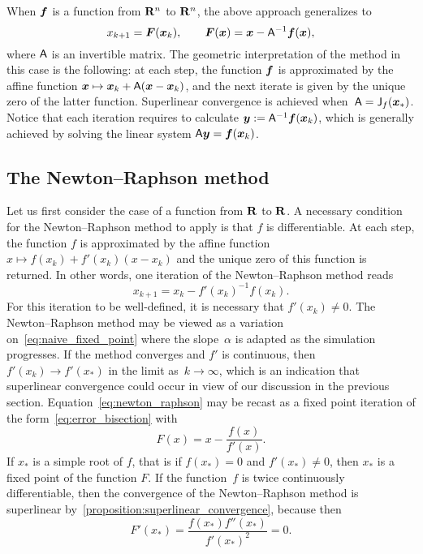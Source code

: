 When $\mathbf{\boldsymbol{f}}$ is a function from $\mathbf R^n$ to $\mathbf R^n$,
the above approach generalizes to
\[
    x_{k+1} = \mathbf{\boldsymbol{F}}(\mathbf{\boldsymbol{x}}_k), \qquad
    \mathbf{\boldsymbol{F}}(\mathbf{\boldsymbol{x}}) = \mathbf{\boldsymbol{x}} - \mathsf A^{-1} \mathbf{\boldsymbol{f}}(\mathbf{\boldsymbol{x}}),
\]
where $\mathsf A$ is an invertible matrix.
The geometric interpretation of the method in this case is the following:
at each step, the function $\mathbf{\boldsymbol{f}}$ is approximated by the affine function
$\mathbf{\boldsymbol{x}} \mapsto \mathbf{\boldsymbol{x}}_k + \mathsf A(\mathbf{\boldsymbol{x}} - \mathbf{\boldsymbol{x}}_k)$,
and the next iterate is given by the unique zero of the latter function.
Superlinear convergence is achieved when~$\mathsf A = \mathsf J_f(\mathbf{\boldsymbol{x}}_*)$.
Notice that each iteration requires to calculate $\mathbf{\boldsymbol{y}} := \mathsf A^{-1} \mathbf{\boldsymbol{f}}(\mathbf{\boldsymbol{x}}_k)$,
which is generally achieved by solving the linear system $\mathsf A \mathbf{\boldsymbol{y}} = \mathbf{\boldsymbol{f}}(\mathbf{\boldsymbol{x}}_k)$.

\subsection{The Newton--Raphson method}
\label{sub:newton_raphson}
Let us first consider the case of a function from $\mathbf R$ to $\mathbf R$.
A necessary condition for the Newton--Raphson method to apply is that $f$ is differentiable.
At each step, the function $f$ is approximated by the affine function
$x \mapsto f(x_k) + f'(x_k) (x - x_k)$ and the unique zero of this function is returned.
In other words, one iteration of the Newton--Raphson method reads
\begin{equation}
    \label{eq:newton_raphson}
    x_{k+1} = x_k - f'(x_k)^{-1} f(x_k).
\end{equation}
For this iteration to be well-defined,
it is necessary that $f'(x_k) \neq 0$.
The Newton--Raphson method may be viewed as a variation on~\eqref{eq:naive_fixed_point} where the slope~$\alpha$ is adapted as the simulation progresses.
If the method converges and $f'$ is continuous,
then $f'(x_k) \to f'(x_*)$ in the limit as~$k \to \infty$,
which is an indication that superlinear convergence could occur in view of our discussion in the previous section.
Equation~\eqref{eq:newton_raphson} may be recast as a fixed point iteration of the form~\eqref{eq:error_bisection} with
\[
    F(x) = x - \frac{f(x)}{f'(x)}.
\]
If $x_*$ is a simple root of $f$, that is if $f(x_*) = 0$ and $f'(x_*) \neq 0$,
then $x_*$ is a fixed point of the function $F$.
If the function~$f$ is twice continuously differentiable,
then the convergence of the Newton--Raphson method is superlinear by~\cref{proposition:superlinear_convergence},
because then
\[
    F'(x_*) = \frac{f(x_*) f''(x_*)}{f'(x_*)^2} = 0.
\]
